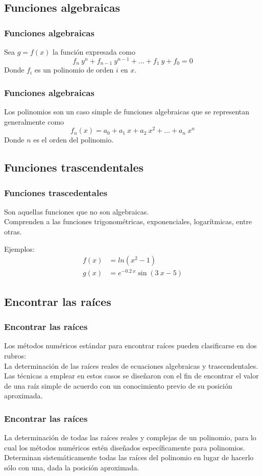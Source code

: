 \subsection{Funciones algebraicas}
\begin{frame}
\frametitle{Funciones algebraicas}
Sea $g = f(x)$ la función expresada como
\[ f_{n} \: y^{n} + f_{n-1} \: y^{n - 1} + \ldots + f_{1} \: y + f_{0} = 0 \]
Donde $f_{i}$ es un polinomio de orden $i$ en $x$.
\end{frame}
\begin{frame}
\frametitle{Funciones algebraicas}
Los polinomios son un caso simple de funciones algebraicas que se representan generalmente como
\[f_{n}(x) = a_{0} + a_{1} \: x + a_{2} \: x^{2}+ \ldots +a_{n} \: x^{n} \]
Donde $n$ es el orden del polinomio.
\end{frame}
\subsection{Funciones trascendentales}
\begin{frame}
\frametitle{Funciones trascedentales}
Son aquellas funciones que no son algebraicas.
\\
\bigskip
Comprenden a las funciones trigonométricas, exponenciales, logarítmicas, entre otras.
\\
\bigskip
\pause

Ejemplos:
\begin{align*}
f(x) &= ln(x^{2} - 1) \\
g(x) &= e^{-0.2 \: x} \sin(3 \: x - 5)
\end{align*}
\end{frame}
\subsection{Encontrar las raíces}
\begin{frame}
\frametitle{Encontrar las raíces}
Los métodos numéricos estándar para encontrar raíces pueden clasificarse en dos rubros:
\\
\bigskip
{} La determinación de las raíces reales de ecuaciones algebraicas y trascendentales.
\\
\bigskip
\pause
Las técnicas a emplear en estos casos se diseñaron con el fin de encontrar el valor de una raíz simple de acuerdo con un conocimiento previo de su posición aproximada.
\end{frame}
\begin{frame}
\frametitle{Encontrar las raíces}
 La determinación de todas las raíces reales y complejas de un polinomio, para lo cual los métodos numéricos estén diseñados específicamente para polinomios. 
\\
\bigskip
\pause
Determinan sistemáticamente todas las raíces del polinomio en lugar de hacerlo sólo con una, dada la posición aproximada.
\end{frame}
